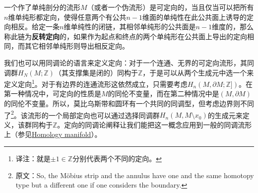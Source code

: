 


一个作了单纯剖分的流形$M$（或者一个伪流形）是可定向的，当且仅当可以把所有$n$维单纯形都定向，使得任意两个有公共$n-1$维面的单纯性在此公共面上诱导的定向相反。给定一条$n$维单纯性的闭链，其相邻单纯形的公共面是$n-1$维度的，那么称此链为\textbf{反转定向}的，如果作为起点和终点的两个单纯形在公共面上导出的定向相同，而其它相邻单纯形则导出相反定向。


我们也可以用同调论的语言来定义定向：对于一个连通、无界的可定向流形，其同调群$H_N(M; \mathbb{Z})$（其支撑集是闭的）同构于$\mathbb{Z}$，于是可以从两个生成元中选一个来定义定向\footnote{译注：就是$\pm 1\in\mathbb{Z}$分别代表两个不同的定向。}。对于有边界的连通流形这依然成立，只需要考虑$H_n(M, \partial M; \mathbb{Z]})$。在第一种情况中，可定向的性质是$M$的同伦不变量，而在第二种情况中是$(M, \partial M)$的同伦不变量。所以，莫比乌斯带和圆环有一个共同的同调型，但考虑边界则不同了\footnote{原文：So, the Möbius strip and the annulus have one and the same homotopy type but a different one if one considers the boundary. }。该流形的一个局部定向也可以通过选择同调群$H_n(M, M\setminus x_0)$的生成元来定义，该群同构于$\mathbb{Z}$。定向的同调论阐释让我们能把这一概念应用到一般的同调流形上（参见\href{https://encyclopediaofmath.org/wiki/Homology_manifold}{Homology manifold}）。

